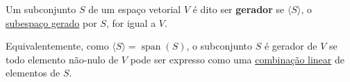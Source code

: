 \begin{definition}
	Um subconjunto $S$ de um espaço vetorial $V$ é dito ser \textbf{gerador} se $\langle S\rangle$, o \href{http://mtm.ufsc.br/~cordeiro/ensino/mtm3112.algebra.linear/04.span/con_subesp_ger_moodle.html}{subespaço gerado} por $S$, for igual a $V$.
	
	Equivalentemente, como \href{http://mtm.ufsc.br/~cordeiro/ensino/mtm3112.algebra.linear/04.span/teo_span_subesp_ger_moodle.html}{$\langle S\rangle=\operatorname{span}(S)$}, o subconjunto $S$ é gerador de $V$ se todo elemento não-nulo de $V$ pode ser expresso como uma \href{http://mtm.ufsc.br/~cordeiro/ensino/mtm3112.algebra.linear/04.span/con_comb_lin_moodle.html}{combinação linear} de elementos de $S$.
\end{definition}